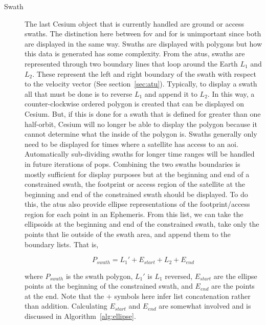 \begin{description}
    \item[Swath] The last Cesium object that is currently handled are ground or
	access swaths. The distinction here between \gls{fov} and \gls{for} is
	unimportant since both are displayed in the same way. Swaths are
	displayed with polygons but how this data is generated has some
	complexity.  From the \glspl{atu}, swaths are represented through two
	boundary lines that loop around the Earth $L_1$ and $L_2$. These
	represent the left and right boundary of the swath with respect to the
	velocity vector (See section~\ref{sec:atu}).  Typically, to display a
	swath all that must be done is to reverse $L_1$ and append it to $L_2$.
	In this way, a counter-clockwise ordered polygon is created that can be
	displayed on Cesium.  But, if this is done for a swath that is defined
	for greater than one half-orbit, Cesium will no longer be able to
	display the polygon because it cannot determine what the inside of the
	polygon is.  Swaths generally only need to be displayed for times where
	a satellite has access to an \gls{aoi}. Automatically sub-dividing
	swaths for longer time ranges will be handled in future iterations of
	\gls{pops}.  Combining the two swaths boundaries is mostly sufficient
	for display purposes but at the beginning and end of a constrained
	swath, the footprint or access region of the satellite at the beginning
	and end of the constrained swath should be displayed. To do this, the
	\glspl{atu} also provide ellipse representations of the
	footprint/access region for each point in an Ephemeris.  From this
	list, we can take the ellipsoids at the beginning and end of the
	constrained swath, take only the points that lie outside of the swath
	area, and append them to the boundary lists.  That is, 

	\begin{equation*} 
	    P_{swath} = L_1' + E_{start} + L_2 + E_{end} 
	\end{equation*} 

	where $P_{swath}$ is the swath polygon, $L_1'$ is $L_1$ reversed,
	$E_{start}$ are the ellipse points at the beginning of the constrained
	swath, and $E_{end}$ are the points at the end.  Note that the $+$ symbols
	here infer list concatenation rather than addition.  Calculating
	$E_{start}$ and $E_{end}$ are somewhat involved and is discussed in
	Algorithm~\ref{alg:ellipse}.
	

\end{description}
